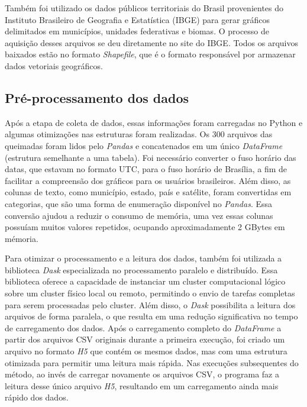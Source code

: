 \documentclass[cic,tc]{iiufrgs}
\begin{document}
Também foi utilizado os dados públicos territoriais do Brasil provenientes do Instituto Brasileiro de Geografia e Estatística (IBGE) para gerar gráficos delimitados em municípios, unidades federativas e biomas. O processo de aquisição desses arquivos se deu diretamente no site do IBGE. Todos os arquivos baixados estão no formato \textit{Shapefile}, que é o formato responsável por armazenar dados vetoriais geográficos.

\subsection*{Pré-processamento dos dados}

Após a etapa de coleta de dados, essas informações foram carregadas no Python e algumas otimizações nas estruturas foram realizadas. Os 300 arquivos das queimadas foram lidos pelo \textit{Pandas} e concatenados em um único \textit{DataFrame} (estrutura semelhante a uma tabela). Foi necessário converter o fuso horário das datas, que estavam no formato UTC, para o fuso horário de Brasília, a fim de facilitar a compreensão dos gráficos para os usuários brasileiros. Além disso, as colunas de texto, como município, estado, país e satélite, foram convertidas em categorias, que são uma forma de enumeração disponível no \textit{Pandas}. Essa conversão ajudou a reduzir o consumo de memória, uma vez essas colunas possuíam muitos valores repetidos, ocupando aproximadamente 2 GBytes em mémoria.

Para otimizar o processamento e a leitura dos dados, também foi utilizada a biblioteca \textit{Dask} especializada no processamento paralelo e distribuído. Essa biblioteca oferece a capacidade de instanciar um cluster computacional lógico sobre um cluster físico local ou remoto, permitindo o envio de tarefas completas para serem processadas pelo cluster. Além disso, o \textit{Dask} possibilita a leitura dos arquivos de forma paralela, o que resulta em uma redução significativa no tempo de carregamento dos dados. Após o carregamento completo do \textit{DataFrame} a partir dos arquivos CSV originais durante a primeira execução, foi criado um arquivo no formato \textit{H5} que contém os mesmos dados, mas com uma estrutura otimizada para permitir uma leitura mais rápida. Nas execuções subsequentes do método, ao invés de carregar novamente os arquivos CSV, o programa faz a leitura desse único arquivo \textit{H5}, resultando em um carregamento ainda mais rápido dos dados.
\end{document}
